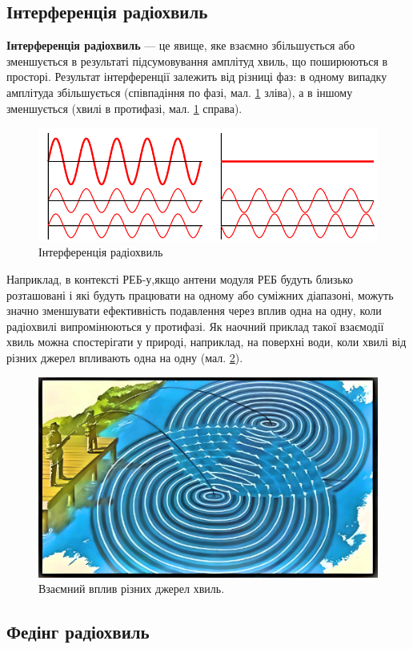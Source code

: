 \documentclass{article}
\begin{document}
\subsection{Інтерференція радіохвиль}

\textbf{Інтерференція радіохвиль} --- це явище, яке взаємно збільшується або зменшується в результаті підсумовування амплітуд хвиль, що поширюються в просторі. Результат інтерференції залежить від різниці фаз: в одному випадку амплітуда збільшується (співпадіння по фазі, мал. \ref{fig:interferense} зліва), а в іншому зменшується (хвилі в протифазі, мал. \ref{fig:interferense} справа).

\begin{figure}[h!]
\centering
\includegraphics[width=0.7\linewidth]{images/interferense.png}
\caption{\label{fig:interferense}Інтерференція радіохвиль}
\end{figure}

Наприклад, в контексті РЕБ-у,якщо антени модуля РЕБ будуть близько розташовані і які будуть працювати на одному або суміжних діапазоні, можуть значно зменшувати ефективність подавлення через вплив одна на одну, коли радіохвилі випромінюються у протифазі. Як наочний приклад такої взаємодії хвиль можна спостерігати у природі, наприклад, на поверхні води, коли хвилі від різних джерел впливають одна на одну (мал. \ref{fig:two-emmitions}).

\begin{figure}[h!]
\centering
\includegraphics[width=0.6\linewidth]{images/two-emmitions.png}
\caption{\label{fig:two-emmitions}Взаємний вплив різних джерел хвиль.}
\end{figure}

\subsection{Федінг радіохвиль}
\end{document}
